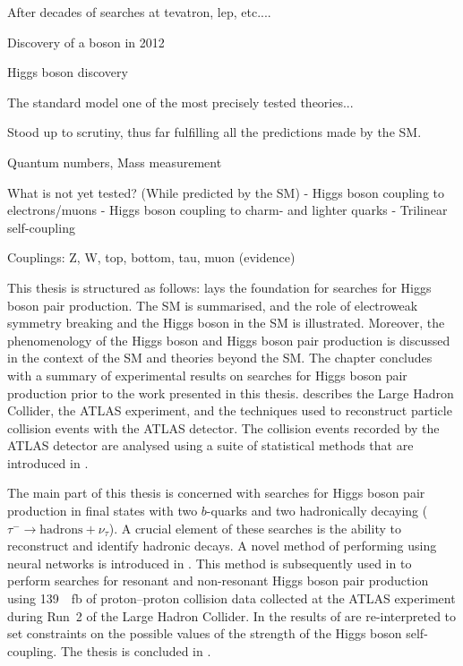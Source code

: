 After decades of searches at tevatron, lep, etc....

Discovery of a boson \cite{HIGG-2012-27,CMS-HIG-12-028} in 2012

Higgs boson discovery



The standard model one of the most precisely tested theories...

Stood up to scrutiny, thus far fulfilling all the predictions made by the SM.

Quantum numbers, Mass measurement

What is not yet tested? (While predicted by the SM)
- Higgs boson coupling to electrons/muons
- Higgs boson coupling to charm- and lighter quarks
- Trilinear self-coupling


Couplings: Z, W, top, bottom, tau, muon (evidence)

\clearpage

This thesis is structured as follows:  lays the
foundation for searches for Higgs boson pair production. The SM is summarised,
and the role of electroweak symmetry breaking and the Higgs boson in the SM is
illustrated. Moreover, the phenomenology of the Higgs boson and Higgs boson pair
production is discussed in the context of the SM and theories beyond the SM. The
chapter concludes with a summary of experimental results on searches for Higgs
boson pair production prior to the work presented in this thesis.
 describes the Large Hadron Collider, the ATLAS
experiment, and the techniques used to reconstruct particle collision events
with the ATLAS detector. The collision events recorded by the ATLAS detector are
analysed using a suite of statistical methods that are introduced in
.

The main part of this thesis is concerned with searches for Higgs boson pair
production in final states with two $b$-quarks and two hadronically decaying
\tauleptons ($\tau^{-} \to \text{hadrons} + \nu_\tau$). A crucial element of
these searches is the ability to reconstruct and identify hadronic \taulepton
decays. A novel method of performing \tauid using neural networks is
introduced in . This method is subsequently used in
 to perform searches for resonant and non-resonant Higgs boson
pair production using \SI{139}{\per\femto\barn} of proton--proton collision data
collected at the ATLAS experiment during Run~2 of the Large Hadron Collider. In
 the results of  are
re-interpreted to set constraints on the possible values of the strength of the
Higgs boson self-coupling. The thesis is concluded in .

